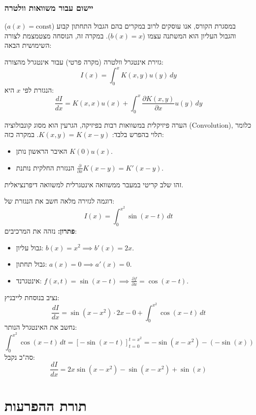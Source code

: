\subsubsection{יישום עבור משוואות וולטרה}
במסגרת הקורס, אנו עוסקים לרוב במקרים בהם הגבול התחתון קבוע ($a(x) = \text{const}$) והגבול העליון הוא המשתנה עצמו ($b(x) = x$). במקרה זה, הנוסחה מצטמצמת לצורה השימושית הבאה:

\begin{resultbox}{גזירת אינטגרל וולטרה (מקרה פרטי)}
עבור אינטגרל מהצורה:
\[
I(x) = \int_{0}^{x} K(x,y) u(y) \, dy
\]
הנגזרת לפי $x$ היא:
\[
\frac{dI}{dx} = K(x,x) u(x) + \int_{0}^{x} \frac{\partial K(x,y)}{\partial x} u(y) \, dy
\]
\end{resultbox}

\begin{notebox}{הערה פיזיקלית}
במשוואות רבות בפיזיקה, הגרעין הוא מסוג קונבולוציה (Convolution), כלומר תלוי בהפרש בלבד: $K(x,y) = K(x-y)$. במקרה כזה:
\begin{itemize}
    \item האיבר הראשון נותן $K(0)u(x)$.
    \item הנגזרת החלקית נותנת $\frac{\partial}{\partial x} K(x-y) = K'(x-y)$.
\end{itemize}
זהו שלב קריטי במעבר ממשוואה אינטגרלית למשוואה דיפרנציאלית.
\end{notebox}

\begin{examplebox}{דוגמה לגזירה מלאה}
חשב את הנגזרת של:
\[
I(x) = \int_{0}^{x^2} \sin(x-t) \, dt
\]
\textbf{פתרון:}
נזהה את המרכיבים:
\begin{itemize}
    \item גבול עליון: $b(x) = x^2 \implies b'(x) = 2x$.
    \item גבול תחתון: $a(x) = 0 \implies a'(x) = 0$.
    \item אינטגרנד: $f(x,t) = \sin(x-t) \implies \frac{\partial f}{\partial x} = \cos(x-t)$.
\end{itemize}
נציב בנוסחת לייבניץ:
\[
\frac{dI}{dx} = \sin(x - x^2) \cdot 2x - 0 + \int_{0}^{x^2} \cos(x-t) \, dt
\]
נחשב את האינטגרל הנותר:
\[
\int_{0}^{x^2} \cos(x-t) \, dt = \left[ -\sin(x-t) \right]_{t=0}^{t=x^2} = -\sin(x-x^2) - (-\sin(x))
\]
סה"כ נקבל:
\[
\frac{dI}{dx} = 2x \sin(x-x^2) - \sin(x-x^2) + \sin(x)
\]
\end{examplebox}

\section{תורת ההפרעות }

